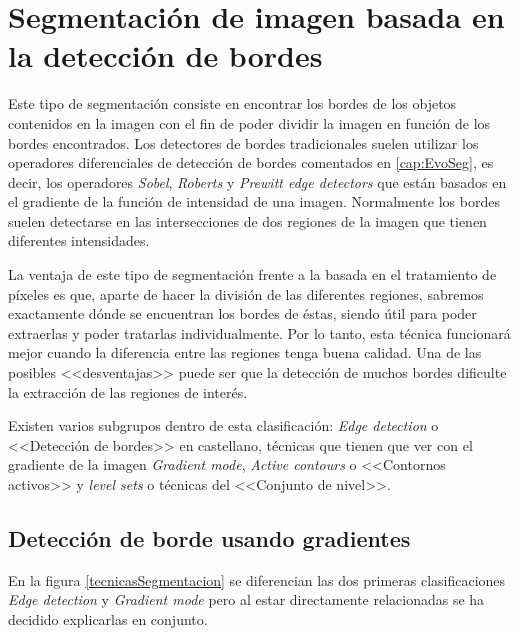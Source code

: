 \section{Segmentaci\'{o}n de imagen basada en la detecci\'{o}n de bordes}

Este tipo de segmentaci\'{o}n consiste en encontrar los bordes de los objetos contenidos en la imagen con el fin de poder dividir la imagen en funci\'{o}n de los bordes encontrados. Los detectores de bordes tradicionales suelen utilizar los operadores diferenciales de detecci\'{o}n de bordes comentados en \ref{cap:EvoSeg}, es decir, los operadores \textit{Sobel}, \textit{Roberts} y \textit{Prewitt edge detectors} que est\'{a}n basados en el gradiente de la funci\'{o}n de intensidad de una imagen. Normalmente los bordes suelen detectarse en las intersecciones de dos regiones de la imagen que tienen diferentes intensidades.

La ventaja de este tipo de segmentaci\'{o}n frente a la basada en el tratamiento de p\'{i}xeles es que, aparte de hacer la divisi\'{o}n de las diferentes regiones, sabremos exactamente d\'{o}nde se encuentran los bordes de \'{e}stas, siendo \'{u}til para poder extraerlas y poder tratarlas individualmente. Por lo tanto, esta t\'{e}cnica funcionar\'{a} mejor cuando la diferencia entre las regiones tenga buena calidad. Una de las posibles <<desventajas>> puede ser que la detecci\'{o}n de muchos bordes dificulte la extracci\'{o}n de las regiones de inter\'{e}s.

Existen varios subgrupos dentro de esta clasificaci\'{o}n: \textit{Edge detection} o <<Detecci\'{o}n de bordes>> en castellano, t\'{e}cnicas que tienen que ver con el gradiente de la imagen \textit{Gradient mode}, \textit{Active contours} o <<Contornos activos>> y \textit{level sets} o t\'{e}cnicas del <<Conjunto de nivel>>.

\subsection{Detecci\'{o}n de borde usando gradientes}

En la figura \ref{tecnicasSegmentacion} se diferencian las dos primeras clasificaciones \textit{Edge detection} y \textit{Gradient mode} pero al estar directamente relacionadas se ha decidido explicarlas en conjunto. 

